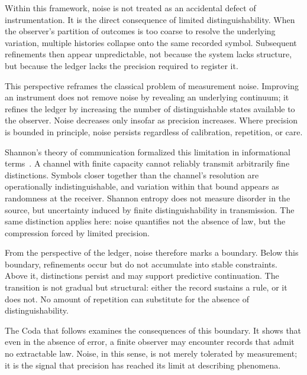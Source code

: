 Within this framework, noise is not treated as an accidental defect of
instrumentation. It is the direct consequence of limited distinguishability.
When the observer’s partition of outcomes is too coarse to resolve
the underlying variation, multiple histories collapse onto the same
recorded symbol. Subsequent refinements then appear unpredictable, not because
the system lacks structure, but because the ledger lacks the precision required
to register it.

This perspective reframes the classical problem of measurement noise. Improving
an instrument does not remove noise by revealing an underlying continuum; it
refines the ledger by increasing the number of distinguishable states available
to the observer. Noise decreases only insofar as precision increases. Where
precision is bounded in principle, noise persists regardless of calibration,
repetition, or care.

Shannon’s theory of communication formalized this limitation in informational
terms~\cite{shannon1948}. A channel with finite capacity cannot reliably transmit arbitrarily fine
distinctions. Symbols closer together than the channel’s resolution are
operationally indistinguishable, and variation within that bound appears as
randomness at the receiver. Shannon entropy does not measure disorder in the
source, but uncertainty induced by finite distinguishability in transmission.
The same distinction applies here: noise quantifies not the absence of law, but
the compression forced by limited precision.

From the perspective of the ledger, noise therefore marks a boundary. Below this
boundary, refinements occur but do not accumulate into stable constraints.
Above it, distinctions persist and may support predictive continuation. The
transition is not gradual but structural: either the record sustains a rule, or
it does not. No amount of repetition can substitute for the absence of
distinguishability.

The Coda that follows examines the consequences of this boundary. It shows that
even in the absence of error, a finite observer may encounter records that admit
no extractable law. Noise, in this sense, is not merely tolerated by measurement;
it is the signal that precision has reached its limit at describing phenomena.

